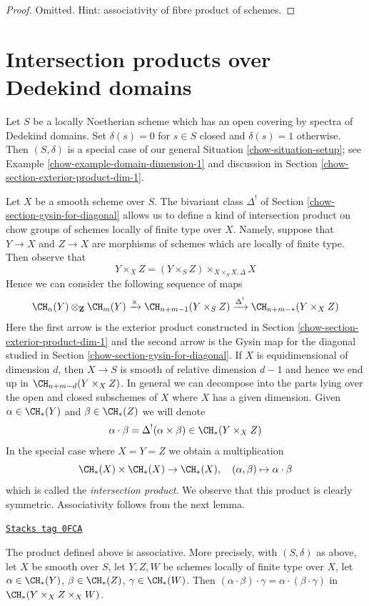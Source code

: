 \begin{proof}
Omitted. Hint: associativity of fibre product of schemes.
\end{proof}

\section{Intersection products over Dedekind domains}
\label{chow-section-intersection-product-dim-1}
Let $S$ be a locally Noetherian scheme which has an open covering
by spectra of Dedekind domains. Set $\delta(s) = 0$ for $s \in S$ closed
and $\delta(s) = 1$ otherwise. Then $(S, \delta)$ is a special case of our
general Situation \ref{chow-situation-setup}; see
Example \ref{chow-example-domain-dimension-1} and discussion in
Section \ref{chow-section-exterior-product-dim-1}.

\medskip\noindent
Let $X$ be a smooth scheme over $S$. The bivariant class $\Delta^!$
of Section \ref{chow-section-gysin-for-diagonal} allows us to define a kind of
intersection product on chow groups of schemes locally of finite type over $X$.
Namely, suppose that $Y \to X$ and $Z \to X$ are morphisms of schemes
which are locally of finite type. Then observe that
$$
Y \times_X Z =  (Y \times_S Z) \times_{X \times_S X, \Delta} X
$$
Hence we can consider the following sequence of maps
$$
\CH_n(Y) \otimes_\mathbf{Z} \CH_m(Y)
\xrightarrow{\times}
\CH_{n + m - 1}(Y \times_S Z)
\xrightarrow{\Delta^!}
\CH_{n + m - *}(Y \times_X Z)
$$
Here the first arrow is the exterior product constructed in
Section \ref{chow-section-exterior-product-dim-1} and the second arrow
is the Gysin map for the diagonal studied in
Section \ref{chow-section-gysin-for-diagonal}. If $X$ is equidimensional
of dimension $d$, then $X \to S$ is smooth of relative dimension $d - 1$
and hence we end up in $\CH_{n + m - d}(Y \times_X Z)$.
In general we can decompose into the parts lying over the open
and closed subschemes of $X$ where $X$ has a given dimension.
Given $\alpha \in \CH_*(Y)$ and $\beta \in \CH_*(Z)$ we will denote
$$
\alpha \cdot \beta = \Delta^!(\alpha \times \beta)
\in \CH_*(Y \times_X Z)
$$
In the special case where $X = Y = Z$ we obtain a multiplication
$$
\CH_*(X) \times \CH_*(X) \to \CH_*(X),\quad
(\alpha, \beta) \mapsto \alpha \cdot \beta
$$
which is called the {\it intersection product}. We observe that
this product is clearly symmetric. Associativity follows from
the next lemma.

\begin{lemma}
\label{chow-lemma-associative-dim-1}
\href{https://stacks.math.columbia.edu/tag/0FCA}{\texttt{Stacks tag 0FCA}}

The product defined above is associative. More precisely, with
$(S, \delta)$ as above, let $X$ be smooth over $S$,
let $Y, Z, W$ be schemes locally of finite type over $X$, let
$\alpha \in \CH_*(Y)$, $\beta \in \CH_*(Z)$, $\gamma \in \CH_*(W)$.
Then $(\alpha \cdot \beta) \cdot \gamma =
\alpha \cdot (\beta \cdot \gamma)$ in $\CH_*(Y \times_X Z \times_X W)$.
\end{lemma}

